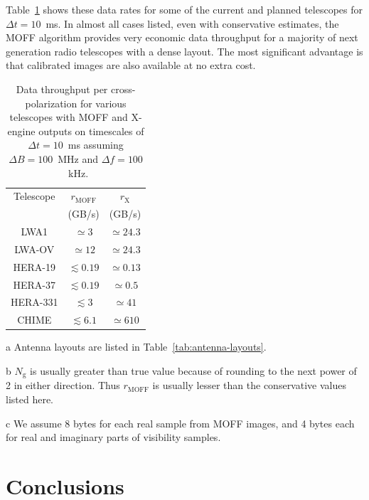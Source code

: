 \documentclass[a4paper,fleqn,usenatbib]{mnras}
\newcommand{\Ngrid}{N_\textrm{g}}
\begin{document}
Table~\ref{tab:data-rates} shows these data rates for some of the current and 
planned telescopes for $\Delta t=10$~ms. In almost all cases listed, even with 
conservative estimates, the MOFF algorithm provides very economic data 
throughput for a majority of next generation radio telescopes with a dense 
layout. The most significant advantage is that calibrated images are also 
available at no extra cost.

\begin{table}
  \centering
  \caption{Data throughput per cross-polarization for various telescopes with 
    MOFF and X-engine outputs on timescales of $\Delta t=10$~ms assuming 
    $\Delta B=100$~MHz and $\Delta f=100$~kHz.}
  \label{tab:data-rates}
  \begin{threeparttable}
  \begin{tabular}{ccc} 
    \hline
    Telescope\tnote{a} & $r_\textrm{MOFF}$\tnote{b} & $r_\textrm{X}$ \\
              & (GB/s)\tnote{c} & (GB/s)\tnote{c} \\
    \hline
    LWA1 & $\simeq 3$ & $\simeq 24.3$ \\
    LWA-OV & $\simeq 12$ & $\simeq 24.3$ \\
    HERA-19 & $\lesssim 0.19$ & $\simeq 0.13$ \\
    HERA-37 & $\lesssim 0.19$ & $\simeq 0.5$ \\
    HERA-331 & $\lesssim 3$ & $\simeq 41$ \\
    CHIME & $\lesssim 6.1$ & $\simeq 610$ \\
    \hline
  \end{tabular}
  \begin{tablenotes}
    \item[a] Antenna layouts are listed in Table~\ref{tab:antenna-layouts}.
    \item[b] $\Ngrid$ is usually greater than true value because of 
      rounding to the next power of 2 in either direction. Thus 
      $r_\textrm{MOFF}$ is usually lesser than the conservative values 
      listed here.
    \item[c] We assume 8 bytes for each real sample from MOFF images, and
      4 bytes each for real and imaginary parts of visibility samples.
  \end{tablenotes}
  \end{threeparttable}
\end{table}

\section{Conclusions}\label{sec:conclusions}
\end{document}
